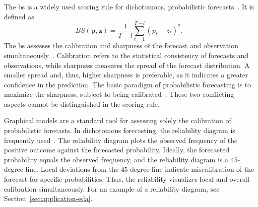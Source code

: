The \ac{bs} is a widely used scoring rule for dichotomous, probabilistic forecasts~\parencite{Brier1950}.
It is defined as
\begin{equation*}
    BS (\mathbf{p}, \mathbf{z}) = \frac{1}{T-l} \sum_{t=1}^{T-l} (p_t - z_t)^2.
\end{equation*}
The \ac{bs} assesses the calibration and sharpness of the forecast and observation simultaneously~\parencite{Ranjan2010,Mitchell2011}.
Calibration refers to the statistical consistency of forecasts and observations, while sharpness measures the spread of the forecast distribution.
A smaller spread and, thus, higher sharpness is preferable, as it indicates a greater confidence in the prediction.
The basic paradigm of probabilistic forecasting is to maximize the sharpness, subject to being calibrated~\parencite{Gneiting2014}.
These two conflicting aspects cannot be distinguished in the scoring rule.

Graphical models are a standard tool for assessing solely the calibration of probabilistic forecasts.
In dichotomous forecasting, the reliability diagram is frequently used~\parencite{Ranjan2010}.
The reliability diagram plots the observed frequency of the positive outcome against the forecasted probability.
Ideally, the forecasted probability equals the observed frequency, and the reliability diagram is a 45-degree line.
Local deviations from the 45-degree line indicate miscalibration of the forecast for specific probabilities.
Thus, the reliability visualizes local and overall calibration simultaneously.
For an example of a reliability diagram, see Section~\ref{sec:application-eda}.

